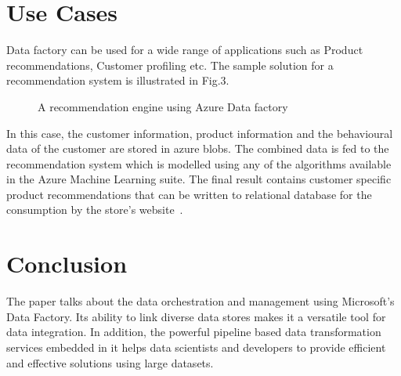 \documentclass[9pt,twocolumn,twoside]{styles/osajnl}
\begin{document}
\section{Use Cases}
Data factory can be used for a wide range of applications such as Product recommendations, Customer profiling etc. The sample solution for a recommendation system is illustrated in Fig.3.
\begin{figure}[htbp]
\centering
{}
\caption{A recommendation engine using Azure Data factory ~\cite{www-microsoft-azure-reco}}
\label{fig:copy-local}
\end{figure}
In this case, the customer information, product information and the behavioural data of the customer are stored in azure blobs. The combined data is fed to the recommendation system which is modelled using any of the algorithms available in the Azure Machine Learning suite. The final result contains customer specific product recommendations that can be written to relational database for the consumption by the store's website~\cite{www-microsoft-azure-reco}.

\section{Conclusion}
The paper talks about the data orchestration and management using Microsoft's Data Factory. Its ability to link diverse data stores makes it a versatile tool for data integration. In addition, the powerful pipeline based data transformation services embedded in it helps data scientists and developers to provide efficient and effective solutions using large datasets. 
\end{document}

